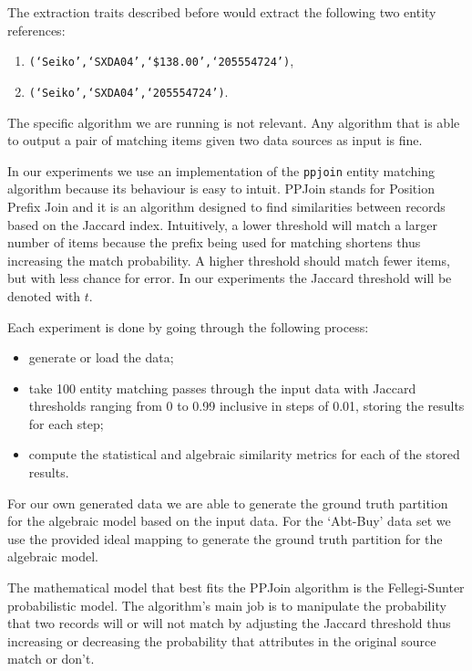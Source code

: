 \documentclass[lettersize,journal]{IEEEtran}
\begin{document}
    The extraction traits described before would extract the following two
    entity references:
    \begin{enumerate}
        \item \texttt{(`Seiko',`SXDA04',`\$138.00',`205554724')},
        \item \texttt{(`Seiko',`SXDA04',`205554724')}.
    \end{enumerate}

    The specific algorithm we are running is not relevant.
    Any algorithm that is able to output a pair of matching items given two
    data sources as input is fine.
    
    In our experiments we use an implementation of the
    \texttt{ppjoin}\cite{ppjoin} entity matching algorithm because its behaviour
    is easy to intuit.
    PPJoin stands for Position Prefix Join and it is an algorithm designed to
    find similarities between records based on the Jaccard
    index\cite{jaccard1912,finley1996}.
    Intuitively, a lower threshold will match a larger number of items because
    the prefix being used for matching shortens thus increasing the match
    probability.
    A higher threshold should match fewer items, but with less chance for error.
    In our experiments the Jaccard threshold will be denoted with $t$.

    Each experiment is done by going through the following process:

    \begin{itemize}
        \item generate or load the data;
        \item take 100 entity matching passes through the input data with
              Jaccard thresholds ranging from 0 to 0.99 inclusive in steps of
              0.01, storing the results for each step;
        \item compute the statistical and algebraic similarity metrics for each
              of the stored results.
    \end{itemize}

    For our own generated data we are able to generate the ground truth
    partition for the algebraic model based on the input data.
    For the `Abt-Buy' data set we use the provided ideal mapping to generate the
    ground truth partition for the algebraic model.
    
    The mathematical model that best fits the PPJoin algorithm is the
    Fellegi-Sunter probabilistic model.
    The algorithm's main job is to manipulate the probability that two records
    will or will not match by adjusting the Jaccard threshold thus increasing or
    decreasing the probability that attributes in the original source match or
    don't.
\end{document}
